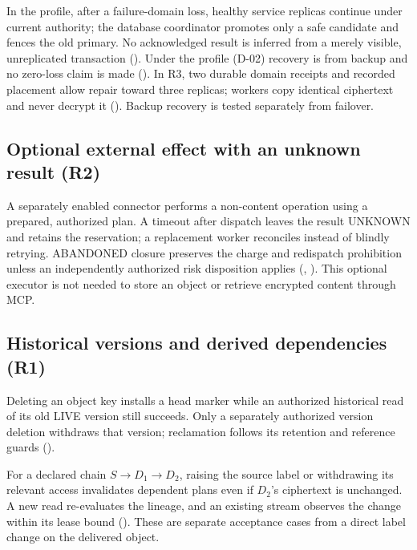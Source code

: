 In the  profile, after a failure-domain loss, healthy service replicas continue under current authority; the database coordinator promotes only a safe candidate and fences the old primary. No acknowledged result is inferred from a merely visible, unreplicated transaction (). Under the  profile (D-02) recovery is from backup and no zero-loss claim is made (). In R3, two durable domain receipts and recorded placement allow repair toward three replicas; workers copy identical ciphertext and never decrypt it (). Backup recovery is tested separately from failover.

\subsection{Optional external effect with an unknown result (R2)}
A separately enabled connector performs a non-content operation using a prepared, authorized plan. A timeout after dispatch leaves the result UNKNOWN and retains the reservation; a replacement worker reconciles instead of blindly retrying. ABANDONED closure preserves the charge and redispatch prohibition unless an independently authorized risk disposition applies (, ). This optional executor is not needed to store an object or retrieve encrypted content through MCP.

\subsection{Historical versions and derived dependencies (R1)}
Deleting an object key installs a head marker while an authorized historical read of its old LIVE version still succeeds. Only a separately authorized version deletion withdraws that version; reclamation follows its retention and reference guards ().

For a declared chain $S \rightarrow D_1 \rightarrow D_2$, raising the source label or withdrawing its relevant access invalidates dependent plans even if $D_2$'s ciphertext is unchanged. A new read re-evaluates the lineage, and an existing stream observes the change within its lease bound (). These are separate acceptance cases from a direct label change on the delivered object.

